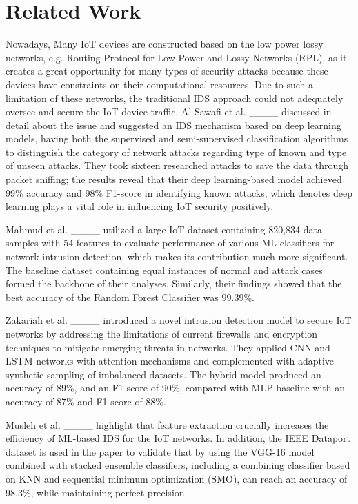 \section{Related Work}
Nowadays, Many IoT devices are constructed based on the low power lossy networks, e.g. Routing Protocol for Low Power and Lossy Networks (RPL), as it creates a great opportunity for many types of security attacks because these devices have constraints on their computational resources. Due to such a limitation of these networks, the traditional IDS approach could not adequately oversee and secure the IoT device traffic. Al Sawafi et al. ____ discussed in detail about the issue and suggested an IDS mechanism based on deep learning models, having both the supervised and semi-supervised classification algorithms to distinguish the category of network attacks regarding type of known and type of unseen attacks. They took sixteen researched attacks to save the data through packet sniffing; the results reveal that their deep learning-based model achieved 99\% accuracy and 98\% F1-score in identifying known attacks, which denotes deep learning plays a vital role in influencing IoT security positively.

Mahmud et al. ____ utilized a large IoT dataset containing 820,834 data samples with 54 features to evaluate performance of various ML classifiers for network intrusion detection, which makes its contribution much more significant. The baseline dataset containing equal instances of normal and attack cases formed the backbone of their analyses. Similarly, their findings showed that the best accuracy of the Random Forest Classifier was 99.39\%. 

Zakariah et al. ____ introduced a novel intrusion detection model to secure IoT networks by addressing the limitations of current firewalls and encryption techniques to mitigate emerging threats in networks. They applied CNN and LSTM networks with attention mechanisms and complemented with adaptive synthetic sampling of imbalanced datasets. The hybrid model produced an accuracy of 89\%, and an F1 score of 90\%, compared with MLP baseline with an accuracy of 87\% and F1 score of 88\%.

Musleh et al. ____ highlight that feature extraction crucially increases the efficiency of ML-based IDS for the IoT networks. In addition, the IEEE Dataport dataset is used in the paper to validate that by using the VGG-16 model combined with stacked ensemble classifiers, including a combining classifier based on KNN and sequential minimum optimization (SMO), can reach an accuracy of 98.3\%, while maintaining perfect precision.

